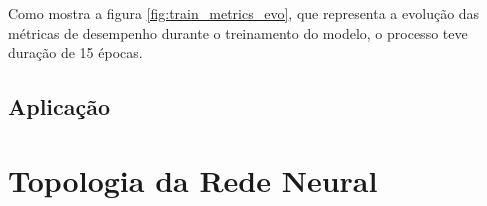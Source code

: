 Como mostra a figura \ref{fig:train_metrics_evo}, que representa a evolução das métricas de desempenho durante o treinamento do modelo, o processo teve duração de 15 épocas.

\subsection{Aplicação}
\label{subsec:application}

% 


\section{Topologia da Rede Neural}
\label{sec:topology}

